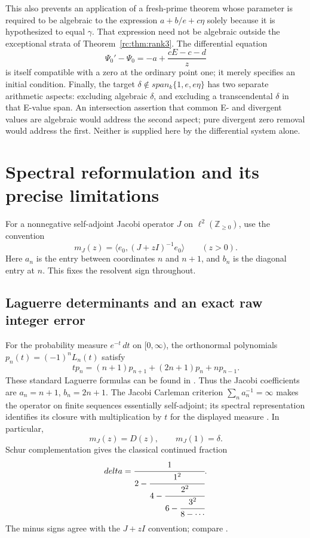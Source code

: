 \documentclass[11pt,a4paper]{article}
\theoremstyle{definition}
\theoremstyle{remark}
\theoremstyle{plain}
\numberwithin{equation}{section}
\def\operatorname#1{#1}\def\mathrm#1{#1}}
\providecommand{\rcSpan}{\operatorname{span}}
\providecommand{\rcZ}{\mathbb Z}
\begin{document}
This also prevents an application of a fresh-prime theorem whose parameter
is required to be algebraic to the expression $a+b/e+c\eta$ solely
because it is hypothesized to equal $\gamma$.  That expression need not
be algebraic outside the exceptional strata of Theorem~\ref{rc:thm:rank3}.
The differential equation
\[
 \Psi_0'-\Psi_0=-a+\frac{cE-c-d}{z}
\]
is itself compatible with a zero at the ordinary point one; it merely
specifies an initial condition.  Finally, the target
$\delta\notin\rcSpan_k\{1,e,e\eta\}$ has two separate arithmetic
aspects: excluding algebraic $\delta$, and excluding a transcendental
$\delta$ in that E-value span.  An intersection assertion that common
E- and divergent values are algebraic would address the second aspect;
pure divergent zero removal would address the first.  Neither is supplied
here by the differential system alone.

\section{Spectral reformulation and its precise limitations}\label{rc:sec:spectral}

For a nonnegative self-adjoint Jacobi operator $J$ on
$\ell^2(\rcZ_{\ge0})$, use the convention
\[
 m_J(z)=\langle e_0,(J+zI)^{-1}e_0\rangle\qquad(z>0).
\]
Here $a_n$ is the entry between coordinates $n$ and $n+1$, and $b_n$
is the diagonal entry at $n$.  This fixes the resolvent sign throughout.

\subsection{Laguerre determinants and an exact raw integer error}

For the probability measure $e^{-t}\,dt$ on $[0,\infty)$, the
orthonormal polynomials $p_n(t)=(-1)^nL_n(t)$ satisfy
\begin{equation}\label{rc:eq:laguerre-recurrence}
 tp_n=(n+1)p_{n+1}+(2n+1)p_n+np_{n-1}.
\end{equation}
These standard Laguerre formulas can be found in
\cite[\S\S18.2,18.9]{DLMF}.  Thus the Jacobi coefficients are
$a_n=n+1$, $b_n=2n+1$.  The Jacobi Carleman criterion
$\sum_na_n^{-1}=\infty$ makes the operator on finite sequences
essentially self-adjoint; its spectral representation identifies its
closure with multiplication by $t$ for the displayed measure
\cite[Chapter 2]{rc:teschl}.  In particular,
\begin{equation}\label{rc:eq:laguerre-weyl}
 m_J(z)=D(z),\qquad m_J(1)=\delta.
\end{equation}
Schur complementation gives the classical continued fraction
\[
 \delta=\cfrac1{2-\cfrac{1^2}{4-\cfrac{2^2}{6-
                    \cfrac{3^2}{8-\cdots}}}}.
\]
The minus signs agree with the $J+zI$ convention; compare
\cite[\S6.9]{DLMF}.
\end{document}
